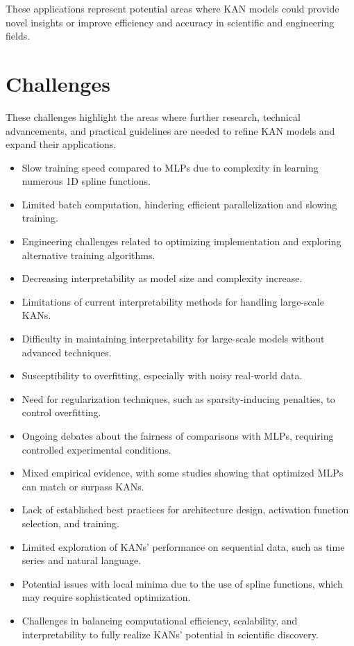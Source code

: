 These applications represent potential areas where KAN models could provide novel insights or improve efficiency and accuracy in scientific and engineering fields.

\section{Challenges}

These challenges highlight the areas where further research, technical advancements, and practical guidelines are needed to refine KAN models and expand their applications.

\begin{itemize}
    \item Slow training speed compared to MLPs due to complexity in learning numerous 1D spline functions.
    \item Limited batch computation, hindering efficient parallelization and slowing training.
    \item Engineering challenges related to optimizing implementation and exploring alternative training algorithms.
    \item Decreasing interpretability as model size and complexity increase.
    \item Limitations of current interpretability methods for handling large-scale KANs.
    \item Difficulty in maintaining interpretability for large-scale models without advanced techniques.
    \item Susceptibility to overfitting, especially with noisy real-world data.
    \item Need for regularization techniques, such as sparsity-inducing penalties, to control overfitting.
    \item Ongoing debates about the fairness of comparisons with MLPs, requiring controlled experimental conditions.
    \item Mixed empirical evidence, with some studies showing that optimized MLPs can match or surpass KANs.
    \item Lack of established best practices for architecture design, activation function selection, and training.
    \item Limited exploration of KANs’ performance on sequential data, such as time series and natural language.
    \item Potential issues with local minima due to the use of spline functions, which may require sophisticated optimization.
    \item Challenges in balancing computational efficiency, scalability, and interpretability to fully realize KANs’ potential in scientific discovery. 
\end{itemize}